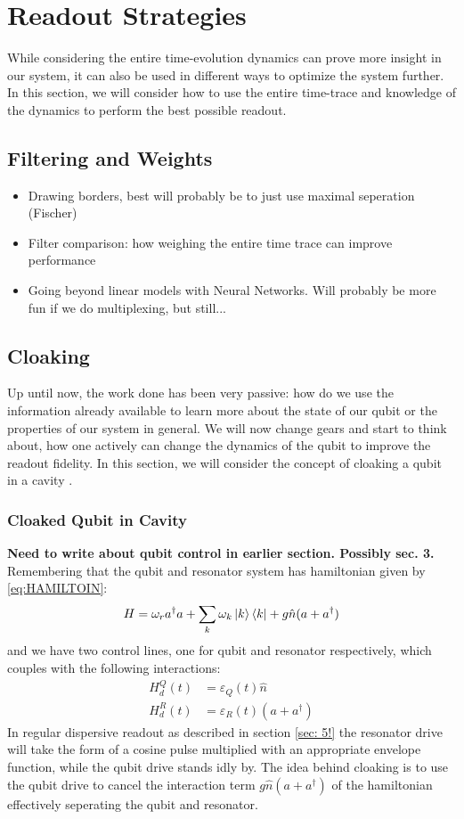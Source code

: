 \chapter{Readout Strategies}
While considering the entire time-evolution dynamics can prove more insight in our system, it can also be used in different ways to optimize the system further. In this section, we will consider how to use the entire time-trace and knowledge of the dynamics to perform the best possible readout.

\section{Filtering and Weights}
\begin{itemize}
    \item Drawing borders, best will probably be to just use maximal seperation (Fischer)
    \item Filter comparison: how weighing the entire time trace can improve performance
    \item Going beyond linear models with Neural Networks. Will probably be more fun if we do multiplexing, but still... 
\end{itemize}

\section{Cloaking}
Up until now, the work done has been very passive: how do we use the information already available to learn more about the state of our qubit or the properties of our system in general. We will now change gears and start to think about, how one actively can change the dynamics of the qubit to improve the readout fidelity. In this section, we will consider the concept of cloaking a qubit in a cavity \cite{llado}. 

\subsection{Cloaked Qubit in Cavity}
\textbf{Need to write about qubit control in earlier section. Possibly sec. 3. } \\
Remembering that the qubit and resonator system has hamiltonian given by \ref{eq:HAMILTOIN}:
\begin{equation}
    H = \omega_r a^\dagger a + \sum_k \omega_k \ket{k}\bra{k} + g \hat{n}(a + a^\dagger)
\end{equation}
and we have two control lines, one for qubit and resonator respectively, which couples with the following interactions:
\begin{align}
    H_d^Q(t) &= \varepsilon_Q(t) \hat{n} \\ 
    H_d^R(t) &= \varepsilon_R(t) (a + a^\dagger) 
\end{align}
In regular dispersive readout as described in section \ref{sec: 5!} the resonator drive will take the form of a cosine pulse multiplied with an appropriate envelope function, while the qubit drive stands idly by. The idea behind cloaking is to use the qubit drive to cancel the interaction term $g\hat{n}(a + a^\dagger )$ of the hamiltonian effectively seperating the qubit and resonator. 


